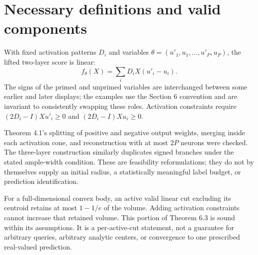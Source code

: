\documentclass[10pt]{article}
\begin{document}
\section*{Necessary definitions and valid components}
With fixed activation patterns \(D_i\) and variables \(\theta=(u'_1,u_1,\ldots,u'_P,u_P)\), the lifted two-layer score is linear: \[f_\theta(X)=\sum_iD_iX(u'_i-u_i).\] The signs of the primed and unprimed variables are interchanged between some earlier and later displays; the examples use the Section 6 convention and are invariant to consistently swapping these roles. Activation constraints require \((2D_i-I)Xu'_i\ge0\) and \((2D_i-I)Xu_i\ge0\).\par
Theorem 4.1’s splitting of positive and negative output weights, merging inside each activation cone, and reconstruction with at most \(2P\) neurons were checked. The three-layer construction similarly duplicates signed branches under the stated ample-width condition. These are feasibility reformulations; they do not by themselves supply an initial radius, a statistically meaningful label budget, or prediction identification.\par
For a full-dimensional convex body, an active valid linear cut excluding its centroid retains at most \(1-1/e\) of the volume. Adding activation constraints cannot increase that retained volume. This portion of Theorem 6.3 is sound within its assumptions. It is a per-active-cut statement, not a guarantee for arbitrary queries, arbitrary analytic centers, or convergence to one prescribed real-valued prediction.\par
\end{document}
